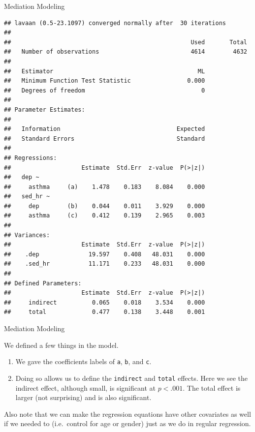 \begin{frame}[fragile]{Mediation Modeling}

\tiny

\begin{verbatim}
## lavaan (0.5-23.1097) converged normally after  30 iterations
## 
##                                                   Used       Total
##   Number of observations                          4614        4632
## 
##   Estimator                                         ML
##   Minimum Function Test Statistic                0.000
##   Degrees of freedom                                 0
## 
## Parameter Estimates:
## 
##   Information                                 Expected
##   Standard Errors                             Standard
## 
## Regressions:
##                    Estimate  Std.Err  z-value  P(>|z|)
##   dep ~                                               
##     asthma     (a)    1.478    0.183    8.084    0.000
##   sed_hr ~                                            
##     dep        (b)    0.044    0.011    3.929    0.000
##     asthma     (c)    0.412    0.139    2.965    0.003
## 
## Variances:
##                    Estimate  Std.Err  z-value  P(>|z|)
##    .dep              19.597    0.408   48.031    0.000
##    .sed_hr           11.171    0.233   48.031    0.000
## 
## Defined Parameters:
##                    Estimate  Std.Err  z-value  P(>|z|)
##     indirect          0.065    0.018    3.534    0.000
##     total             0.477    0.138    3.448    0.001
\end{verbatim}

\end{frame}

\begin{frame}[fragile]{Mediation Modeling}

We defined a few things in the model.

\begin{enumerate}
\def\labelenumi{\arabic{enumi}.}
\tightlist
\item
  We gave the coefficients labels of \texttt{a}, \texttt{b}, and
  \texttt{c}.
\item
  Doing so allows us to define the \texttt{indirect} and \texttt{total}
  effects. Here we see the indirect effect, although small, is
  significant at \(p < .001\). The total effect is larger (not
  surprising) and is also significant.
\end{enumerate}

Also note that we can make the regression equations have other
covariates as well if we needed to (i.e.~control for age or gender) just
as we do in regular regression.

\end{frame}

